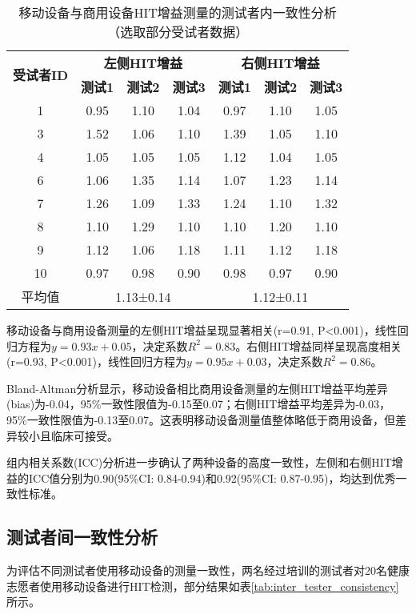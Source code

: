 \begin{table}[ht]
\centering
\caption{移动设备与商用设备HIT增益测量的测试者内一致性分析（选取部分受试者数据）}
\label{tab:intra_tester_consistency}
\begin{tabular}{ccccccc}
\hline
\multirow{2}{*}{\textbf{受试者ID}} & \multicolumn{3}{c}{\textbf{左侧HIT增益}} & \multicolumn{3}{c}{\textbf{右侧HIT增益}} \\
\cline{2-7}
 & \textbf{测试1} & \textbf{测试2} & \textbf{测试3} & \textbf{测试1} & \textbf{测试2} & \textbf{测试3} \\
\hline
1 & 0.95 & 1.10 & 1.04 & 0.97 & 1.10 & 1.05 \\
3 & 1.52 & 1.06 & 1.10 & 1.39 & 1.05 & 1.10 \\
4 & 1.05 & 1.05 & 1.05 & 1.12 & 1.04 & 1.05 \\
6 & 1.06 & 1.35 & 1.14 & 1.07 & 1.23 & 1.14 \\
7 & 1.26 & 1.09 & 1.33 & 1.24 & 1.10 & 1.32 \\
8 & 1.10 & 1.29 & 1.10 & 1.10 & 1.20 & 1.10 \\
9 & 1.12 & 1.06 & 1.18 & 1.11 & 1.12 & 1.18 \\
10 & 0.97 & 0.98 & 0.90 & 0.98 & 0.97 & 0.90 \\
\hline
平均值 & \multicolumn{3}{c}{1.13±0.14} & \multicolumn{3}{c}{1.12±0.11} \\
\hline
\end{tabular}
\end{table}

移动设备与商用设备测量的左侧HIT增益呈现显著相关(r=0.91, P<0.001)，线性回归方程为$y=0.93x+0.05$，决定系数$R^2=0.83$。右侧HIT增益同样呈现高度相关(r=0.93, P<0.001)，线性回归方程为$y=0.95x+0.03$，决定系数$R^2=0.86$。

Bland-Altman分析显示，移动设备相比商用设备测量的左侧HIT增益平均差异(bias)为-0.04，95\%一致性限值为-0.15至0.07；右侧HIT增益平均差异为-0.03，95\%一致性限值为-0.13至0.07。这表明移动设备测量值整体略低于商用设备，但差异较小且临床可接受。

组内相关系数(ICC)分析进一步确认了两种设备的高度一致性，左侧和右侧HIT增益的ICC值分别为0.90(95\%CI: 0.84-0.94)和0.92(95\%CI: 0.87-0.95)，均达到优秀一致性标准。

\subsection{测试者间一致性分析}

为评估不同测试者使用移动设备的测量一致性，两名经过培训的测试者对20名健康志愿者使用移动设备进行HIT检测，部分结果如表\ref{tab:inter_tester_consistency}所示。


